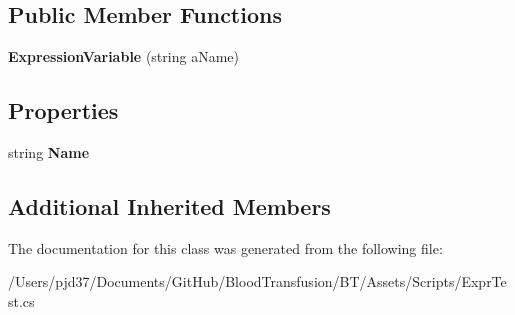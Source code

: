 \subsection*{Public Member Functions}
\begin{DoxyCompactItemize}
\item 
{\bfseries Expression\+Variable} (string a\+Name)\hypertarget{class_b83_1_1_logic_expression_parser_1_1_expression_variable_a55e3f33afd71fcbf9ea47f4622d4989c}{}\label{class_b83_1_1_logic_expression_parser_1_1_expression_variable_a55e3f33afd71fcbf9ea47f4622d4989c}

\end{DoxyCompactItemize}
\subsection*{Properties}
\begin{DoxyCompactItemize}
\item 
string {\bfseries Name}\hypertarget{class_b83_1_1_logic_expression_parser_1_1_expression_variable_a415d58e7bf732e4f3d9bf31ccaf09230}{}\label{class_b83_1_1_logic_expression_parser_1_1_expression_variable_a415d58e7bf732e4f3d9bf31ccaf09230}

\end{DoxyCompactItemize}
\subsection*{Additional Inherited Members}


The documentation for this class was generated from the following file\+:\begin{DoxyCompactItemize}
\item 
/\+Users/pjd37/\+Documents/\+Git\+Hub/\+Blood\+Transfusion/\+B\+T/\+Assets/\+Scripts/Expr\+Test.\+cs\end{DoxyCompactItemize}
